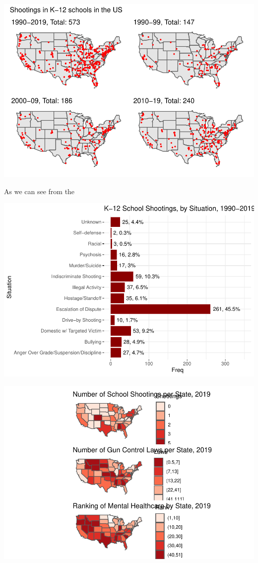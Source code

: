 \documentclass[12pt]{article}
\begin{document}
\includegraphics{JStevenRaquel_STATS295_Final_files/figure-latex/plots-all-four-1.pdf}

As we can see from the

\includegraphics{JStevenRaquel_STATS295_Final_files/figure-latex/plot-situation-1.pdf}

\includegraphics{JStevenRaquel_STATS295_Final_files/figure-latex/plot-areals-2019-1.pdf}
\end{document}

